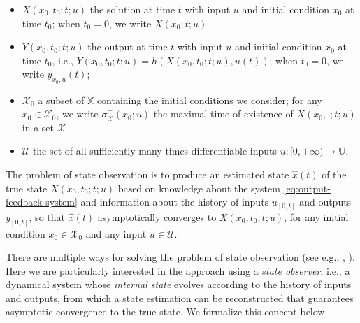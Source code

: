 \documentclass[
]{book}
\theoremstyle{definition}
\theoremstyle{definition}
\theoremstyle{definition}
\theoremstyle{definition}
\theoremstyle{remark}
\begin{document}
\begin{itemize}
\item
  \(X(x_0,t_0;t;u)\) the solution at time \(t\) with input \(u\) and initial condition \(x_0\) at time \(t_0\); when \(t_0 = 0\), we write \(X(x_0;t;u)\)
\item
  \(Y(x_0,t_0;t;u)\) the output at time \(t\) with input \(u\) and initial condition \(x_0\) at time \(t_0\), i.e., \(Y(x_0,t_0;t;u) = h(X(x_0,t_0;t;u), u(t))\); when \(t_0 = 0\), we write \(y_{x_0,u}(t)\);
\item
  \(\mathcal{X}_0\) a subset of \(\mathbb{X}\) containing the initial conditions we consider; for any \(x_0 \in \mathcal{X}_0\), we write \(\sigma^+_{\mathcal{X}}(x_0;u)\) the maximal time of existence of \(X(x_0,\cdot;t;u)\) in a set \(\mathcal{X}\)
\item
  \(\mathcal{U}\) the set of all sufficiently many times differentiable inputs \(u: [0,+\infty) \rightarrow \mathbb{U}\).
\end{itemize}

The problem of state observation is to produce an estimated state \(\hat{x}(t)\) of the true state \(X(x_0,t_0;t;u)\) based on knowledge about the system \eqref{eq:output-feedback-system} and information about the history of inputs \(u_{[0,t]}\) and outputs \(y_{[0,t]}\), so that \(\hat{x}(t)\) asymptotically converges to \(X(x_0,t_0;t;u)\), for any initial condition \(x_0 \in \mathcal{X}_0\) and any input \(u \in \mathcal{U}\).

There are multiple ways for solving the problem of state observation (see e.g., \citep{bernard19book-observer}, \citep{bernard22arc-observer}). Here we are particularly interested in the approach using a \emph{state observer}, i.e., a dynamical system whose \emph{internal state} evolves according to the history of inputs and outputs, from which a state estimation can be reconstructed that guarantees asymptotic convergence to the true state. We formalize this concept below.
\end{document}
